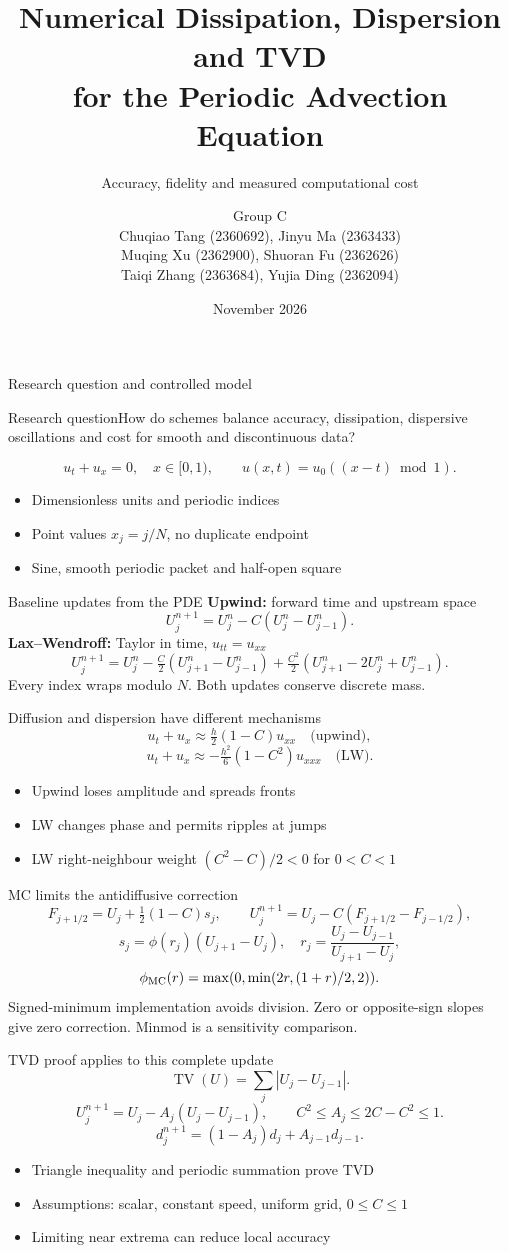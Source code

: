\documentclass[aspectratio=169,10pt]{beamer}
\title[Periodic advection]{Numerical Dissipation, Dispersion and TVD\\for the Periodic Advection Equation}
\subtitle{Accuracy, fidelity and measured computational cost}
\author[Group C]{Group C\\[2mm]\small Chuqiao Tang (2360692), Jinyu Ma (2363433)\\
Muqing Xu (2362900), Shuoran Fu (2362626)\\
Taiqi Zhang (2363684), Yujia Ding (2362094)}
\institute[MTH321 Project 3]{MTH321 Numerical PDEs --- Project 3}
\date[November 2026]{November 2026}
\begin{document}
\begin{frame}[plain]
\titlepage
\end{frame}
\begin{frame}{Research question and controlled model}
\begin{block}{Research question}How do schemes balance accuracy, dissipation, dispersive oscillations and cost for smooth and discontinuous data?\end{block}\[u_t+u_x=0,\quad x\in[0,1),\qquad u(x,t)=u_0((x-t)\bmod1).\]\begin{itemize}\item Dimensionless units and periodic indices\item Point values $x_j=j/N$, no duplicate endpoint\item Sine, smooth periodic packet and half-open square\end{itemize}
\end{frame}
\begin{frame}{Baseline updates from the PDE}
\textbf{Upwind:} forward time and upstream space\[U_j^{n+1}=U_j^n-C(U_j^n-U_{j-1}^n).\]\textbf{Lax--Wendroff:} Taylor in time, $u_{tt}=u_{xx}$\[U_j^{n+1}=U_j^n-\tfrac C2(U_{j+1}^n-U_{j-1}^n)+\tfrac{C^2}2(U_{j+1}^n-2U_j^n+U_{j-1}^n).\]\small Every index wraps modulo $N$. Both updates conserve discrete mass.
\end{frame}
\begin{frame}{Diffusion and dispersion have different mechanisms}
\[u_t+u_x\approx\tfrac h2(1-C)u_{xx}\quad\text{(upwind)},\]\[u_t+u_x\approx-\tfrac{h^2}6(1-C^2)u_{xxx}\quad\text{(LW)}.\]\begin{itemize}\item Upwind loses amplitude and spreads fronts\item LW changes phase and permits ripples at jumps\item LW right-neighbour weight $(C^2-C)/2<0$ for $0<C<1$\end{itemize}
\end{frame}
\begin{frame}{MC limits the antidiffusive correction}
\[F_{j+1/2}=U_j+\tfrac12(1-C)s_j,\qquad U_j^{n+1}=U_j-C(F_{j+1/2}-F_{j-1/2}),\]\[s_j=\phi(r_j)(U_{j+1}-U_j),\quad r_j=\frac{U_j-U_{j-1}}{U_{j+1}-U_j},\]\[\phi_{\rm MC}(r)=\max(0,\min(2r,(1+r)/2,2)).\]\small Signed-minimum implementation avoids division. Zero or opposite-sign slopes give zero correction. Minmod is a sensitivity comparison.
\end{frame}
\begin{frame}{TVD proof applies to this complete update}
\[\operatorname{TV}(U)=\sum_j|U_j-U_{j-1}|.\]\[U_j^{n+1}=U_j-A_j(U_j-U_{j-1}),\qquad C^2\le A_j\le2C-C^2\le1.\]\[d_j^{n+1}=(1-A_j)d_j+A_{j-1}d_{j-1}.\]\begin{itemize}\item Triangle inequality and periodic summation prove TVD\item Assumptions: scalar, constant speed, uniform grid, $0\le C\le1$\item Limiting near extrema can reduce local accuracy\end{itemize}
\end{frame}
\end{document}
